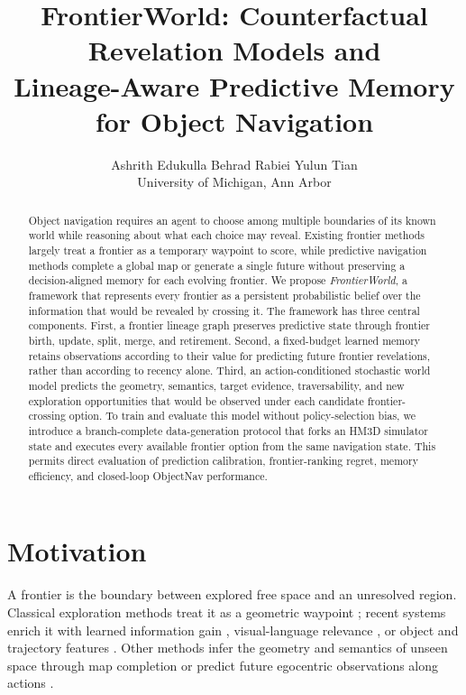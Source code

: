 \documentclass[10pt,twocolumn]{article}
\title{\vspace{-1.5cm}
\textbf{FrontierWorld: Counterfactual Revelation Models and\\
Lineage-Aware Predictive Memory for Object Navigation}
\vspace{-0.35cm}
}
\author{
Ashrith Edukulla \qquad Behrad Rabiei \qquad Yulun Tian\\
University of Michigan, Ann Arbor
}
\date{}
\begin{document}
\maketitle
\vspace{-0.75cm}

\begin{abstract}
Object navigation requires an agent to choose among multiple boundaries of its
known world while reasoning about what each choice may reveal. Existing
frontier methods largely treat a frontier as a temporary waypoint to score,
while predictive navigation methods complete a global map or generate a single
future without preserving a decision-aligned memory for each evolving
frontier. We propose \textit{FrontierWorld}, a framework that represents every
frontier as a persistent probabilistic belief over the information that would
be revealed by crossing it. The framework has three central components.
First, a frontier lineage graph preserves predictive state through frontier
birth, update, split, merge, and retirement. Second, a fixed-budget learned
memory retains observations according to their value for predicting future
frontier revelations, rather than according to recency alone. Third, an
action-conditioned stochastic world model predicts the geometry, semantics,
target evidence, traversability, and new exploration opportunities that would
be observed under each candidate frontier-crossing option. To train and
evaluate this model without policy-selection bias, we introduce a
branch-complete data-generation protocol that forks an HM3D simulator state
and executes every available frontier option from the same navigation state.
This permits direct evaluation of prediction calibration, frontier-ranking
regret, memory efficiency, and closed-loop ObjectNav performance.
\end{abstract}

\vspace{-0.15cm}

\section{Motivation}

A frontier is the boundary between explored free space and an unresolved
region. Classical exploration methods treat it as a geometric waypoint
\cite{yamauchi1997}; recent systems enrich it with learned information gain
\cite{frontiernet}, visual-language relevance \cite{vlfm,openfrontier}, or
object and trajectory features \cite{fomnav}. Other methods infer the geometry
and semantics of unseen space through map completion \cite{foresightnav} or
predict future egocentric observations along actions \cite{nwm}.
\end{document}
